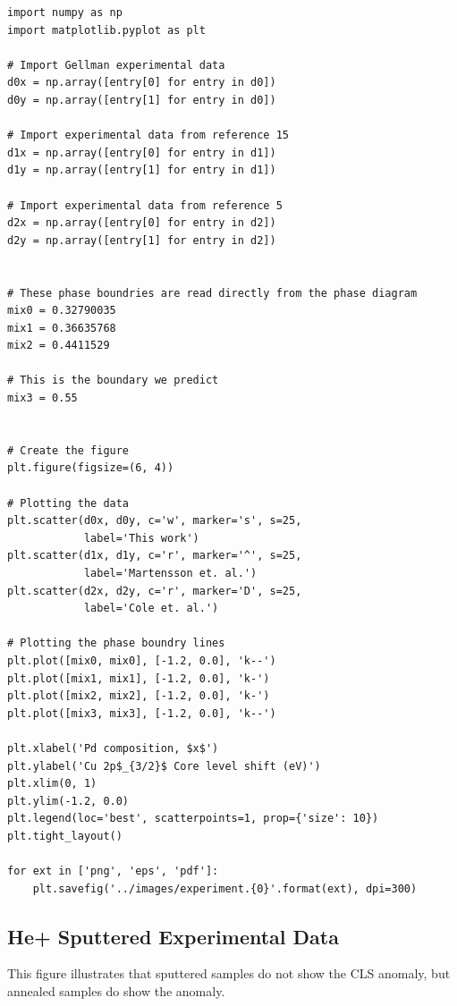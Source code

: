 \documentclass[number, sort&compress, review, 12pt]{elsarticle}
\begin{document}
\begin{verbatim}
import numpy as np
import matplotlib.pyplot as plt

# Import Gellman experimental data
d0x = np.array([entry[0] for entry in d0])
d0y = np.array([entry[1] for entry in d0])

# Import experimental data from reference 15
d1x = np.array([entry[0] for entry in d1])
d1y = np.array([entry[1] for entry in d1])

# Import experimental data from reference 5
d2x = np.array([entry[0] for entry in d2])
d2y = np.array([entry[1] for entry in d2])


# These phase boundries are read directly from the phase diagram
mix0 = 0.32790035
mix1 = 0.36635768
mix2 = 0.4411529

# This is the boundary we predict
mix3 = 0.55


# Create the figure
plt.figure(figsize=(6, 4))

# Plotting the data
plt.scatter(d0x, d0y, c='w', marker='s', s=25,
            label='This work')
plt.scatter(d1x, d1y, c='r', marker='^', s=25,
            label='Martensson et. al.')
plt.scatter(d2x, d2y, c='r', marker='D', s=25,
            label='Cole et. al.')

# Plotting the phase boundry lines
plt.plot([mix0, mix0], [-1.2, 0.0], 'k--')
plt.plot([mix1, mix1], [-1.2, 0.0], 'k-')
plt.plot([mix2, mix2], [-1.2, 0.0], 'k-')
plt.plot([mix3, mix3], [-1.2, 0.0], 'k--')

plt.xlabel('Pd composition, $x$')
plt.ylabel('Cu 2p$_{3/2}$ Core level shift (eV)')
plt.xlim(0, 1)
plt.ylim(-1.2, 0.0)
plt.legend(loc='best', scatterpoints=1, prop={'size': 10})
plt.tight_layout()

for ext in ['png', 'eps', 'pdf']:
    plt.savefig('../images/experiment.{0}'.format(ext), dpi=300)
\end{verbatim}

\subsection{He+ Sputtered Experimental Data}
\label{sec-10-3}
This figure illustrates that sputtered samples do not show the CLS anomaly, but annealed samples do show the anomaly.
\end{document}
